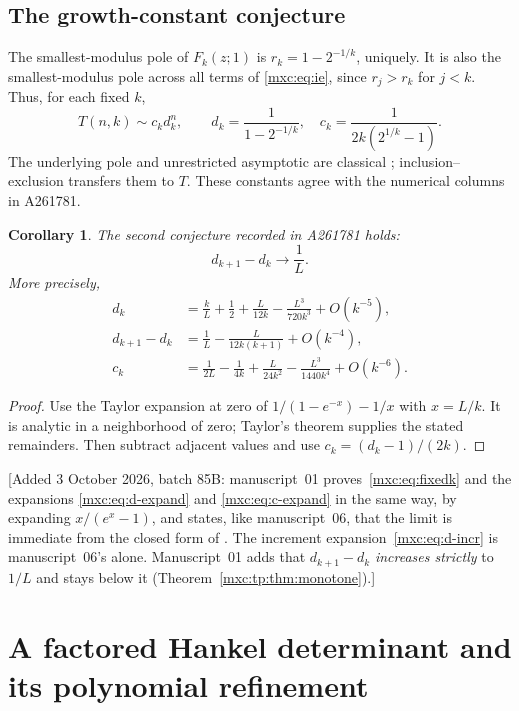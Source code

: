 \documentclass[11pt]{article}
\numberwithin{equation}{section}
\newtheorem{corollary}[theorem]{Corollary}
\theoremstyle{definition}
\theoremstyle{remark}
\begin{document}
\subsection{The growth-constant conjecture}
The smallest-modulus pole of $F_k(z;1)$ is $r_k=1-2^{-1/k}$, uniquely.
It is also the smallest-modulus pole across all terms of
\eqref{mxc:eq:ie}, since $r_j>r_k$ for $j<k$. Thus, for each fixed $k$,
\begin{equation}\label{mxc:eq:fixedk}
 T(n,k)\sim c_kd_k^n,
 \qquad d_k=\frac1{1-2^{-1/k}},\quad
 c_k=\frac1{2k(2^{1/k}-1)}.
\end{equation}
The underlying pole and unrestricted asymptotic are classical
\cite[Proposition~13]{mpr2009}; inclusion--exclusion transfers them
to $T$. These constants agree with the numerical columns in A261781.

\begin{corollary}\label{mxc:cor:increment}
The second conjecture recorded in A261781 holds:
\[
 d_{k+1}-d_k\longrightarrow\frac1L.
\]
More precisely,
\begin{align}
 d_k&=\frac{k}{L}+\frac12+\frac{L}{12k}
               -\frac{L^3}{720k^3}+O(k^{-5}),\label{mxc:eq:d-expand}\\
 d_{k+1}-d_k&=\frac1L-\frac{L}{12k(k+1)}+O(k^{-4}),\label{mxc:eq:d-incr}\\
 c_k&=\frac1{2L}-\frac1{4k}+\frac{L}{24k^2}
                    -\frac{L^3}{1440k^4}+O(k^{-6}).\label{mxc:eq:c-expand}
\end{align}
\end{corollary}
\begin{proof}
Use the Taylor expansion at zero of $1/(1-e^{-x})-1/x$ with
$x=L/k$. It is analytic in a neighborhood of zero; Taylor's theorem
supplies the stated remainders. Then subtract adjacent values and use
$c_k=(d_k-1)/(2k)$.
\end{proof}

[Added 3 October 2026, batch 85B: manuscript~01 proves~\eqref{mxc:eq:fixedk}
and the expansions \eqref{mxc:eq:d-expand} and \eqref{mxc:eq:c-expand} in the
same way, by expanding $x/(e^x-1)$, and states, like manuscript~06, that the
limit is immediate from the closed form of \cite[Proposition~13]{mpr2009}.
The increment expansion~\eqref{mxc:eq:d-incr} is manuscript~06's alone.
Manuscript~01 adds that $d_{k+1}-d_k$ \emph{increases strictly} to $1/L$
and stays below it (Theorem~\ref{mxc:tp:thm:monotone}).]

\section{A factored Hankel determinant and its polynomial refinement}\label{mxc:sec:hankel}
\end{document}
